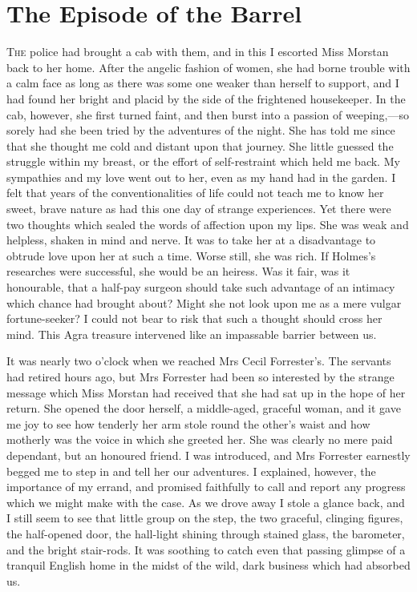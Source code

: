 \chapter{The Episode of the Barrel}
\lettrine[lines=4]{T}{he} police had brought a cab with them, and in this I escorted Miss Morstan back to her home. After the angelic fashion of women, she had borne trouble with a calm face as long as there was some one weaker than herself to support, and I had found her bright and placid by the side of the frightened housekeeper. In the cab, however, she first turned faint, and then burst into a passion of weeping,—so sorely had she been tried by the adventures of the night. She has told me since that she thought me cold and distant upon that journey. She little guessed the struggle within my breast, or the effort of self-restraint which held me back. My sympathies and my love went out to her, even as my hand had in the garden. I felt that years of the conventionalities of life could not teach me to know her sweet, brave nature as had this one day of strange experiences. Yet there were two thoughts which sealed the words of affection upon my lips. She was weak and helpless, shaken in mind and nerve. It was to take her at a disadvantage to obtrude love upon her at such a time. Worse still, she was rich. If Holmes's researches were successful, she would be an heiress. Was it fair, was it honourable, that a half-pay surgeon should take such advantage of an intimacy which chance had brought about? Might she not look upon me as a mere vulgar fortune-seeker? I could not bear to risk that such a thought should cross her mind. This Agra treasure intervened like an impassable barrier between us.

It was nearly two o'clock when we reached Mrs Cecil Forrester's. The servants had retired hours ago, but Mrs Forrester had been so interested by the strange message which Miss Morstan had received that she had sat up in the hope of her return. She opened the door herself, a middle-aged, graceful woman, and it gave me joy to see how tenderly her arm stole round the other's waist and how motherly was the voice in which she greeted her. She was clearly no mere paid dependant, but an honoured friend. I was introduced, and Mrs Forrester earnestly begged me to step in and tell her our adventures. I explained, however, the importance of my errand, and promised faithfully to call and report any progress which we might make with the case. As we drove away I stole a glance back, and I still seem to see that little group on the step, the two graceful, clinging figures, the half-opened door, the hall-light shining through stained glass, the barometer, and the bright stair-rods. It was soothing to catch even that passing glimpse of a tranquil English home in the midst of the wild, dark business which had absorbed us.

